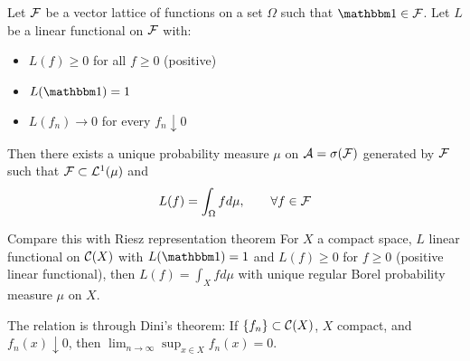 \begin{theorem}
  \label{thm:daniell-integration}
  Let $\mathcal{F}$ be a vector lattice of functions on a set $\Omega$
  such that $\ind \in \cF$.
  Let $L$ be a linear functional on $\mathcal{F}$ with:
  \begin{itemize}
    \item $L(f) \geq 0$ for all $f \geq 0$ (positive)
    \item $L(\ind) = 1$
    \item $L(f_n) \to 0$ for every $f_n \downarrow 0$
  \end{itemize}
  Then there exists a unique probability measure $\mu$ on
  $\mathcal{A} = \sigma(\mathcal{F})$ generated by $\mathcal{F}$ such that
  $\mathcal{F} \subset \mathcal{L}^1(\mu)$ and
  \[
    L(f) = \int_\Omega f d\mu,\qquad \forall f \in \mathcal{F}
  \]
\end{theorem}

\begin{note}{Compare this with Riesz representation theorem}
  For $X$ a compact space, $L$ linear functional on $\mathcal{C}(X)$
  with $L(\ind) = 1$ and $L(f) \geq 0$ for $f \geq 0$
  (positive linear functional),
  then $L(f) = \int_X f d\mu$
  with unique regular Borel probability measure $\mu$ on $X$.

  The relation is through Dini's theorem: If $\{f_n\} \subset \mathcal{C}(X)$,
  $X$ compact, and $f_n(x) \downarrow 0$,
  then $\lim_{n \to \infty} \sup_{x \in X} f_n(x) = 0$.
\end{note}


